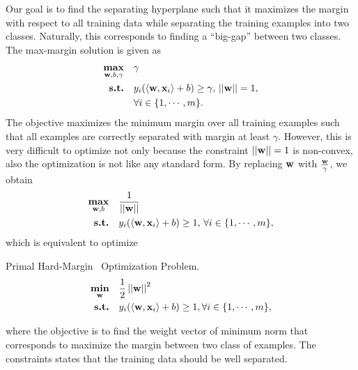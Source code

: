 {Our goal is to find the separating hyperplane such that it maximizes the margin with respect to all training data while separating the training examples into two classes.
Naturally, this corresponds to finding a ``big-gap'' between two classes.
The max-margin solution is given as \citep{Bishop07}
\begin{align*}
	\underset{\mathbf {w},b,\gamma}{\textbf{max}} &\quad \gamma\\
	\textbf{s.t.} &\quad y_i(\langle \mathbf {w}, \mathbf {x}_i \rangle+b) \ge \gamma, \, \left|\left| \mathbf {w} \right|\right|=1,\\
	 &\quad \forall i\in\{1,\cdots,m\}.
\end{align*}
The objective maximizes the minimum margin over all training examples such that all examples are correctly separated with margin at least $\gamma$.
However, this is very difficult to optimize not only because the constraint $\left|\left| \mathbf {w} \right|\right|=1$ is non-convex, also the optimization is not like any standard form.
By replacing $\mathbf {w}$ with $\frac{\mathbf {w}}{\gamma}$, we obtain 
\begin{align*}
	\underset{\mathbf {w},b}{\textbf{max}} &\quad \frac{1}{\left|\left| \mathbf {w} \right|\right|}\\
	\textbf{s.t.} &\quad y_i(\langle \mathbf {w}, \mathbf {x}_i \rangle+b) \ge 1, \, \forall i\in\{1,\cdots,m\},
\end{align*}
which is equivalent to optimize
\begin{definition}{Primal Hard-Margin \svm\ Optimization Problem.}\label{hardsvmprimal}
	\begin{align*}
		\underset{\mathbf {w}}{\textbf{min}} & \quad\frac{1}{2}\left|\left| \mathbf {w} \right|\right|^2\\
		\textbf{s.t.} & \quad y_i(\langle \mathbf {w}, \mathbf {x}_i \rangle + b) \ge 1, \forall i\in\{1,\cdots,m\},
	\end{align*}
\end{definition}
where the objective is to find the weight vector of minimum norm that corresponds to maximize the margin between two class of examples.
The constraints states that the training data should be well separated.

}
